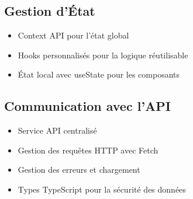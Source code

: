 \subsection{Gestion d'État}
\begin{itemize}
    \item Context API pour l'état global
    \item Hooks personnalisés pour la logique réutilisable
    \item État local avec useState pour les composants
\end{itemize}

\subsection{Communication avec l'API}
\begin{itemize}
    \item Service API centralisé
    \item Gestion des requêtes HTTP avec Fetch
    \item Gestion des erreurs et chargement
    \item Types TypeScript pour la sécurité des données
\end{itemize}
